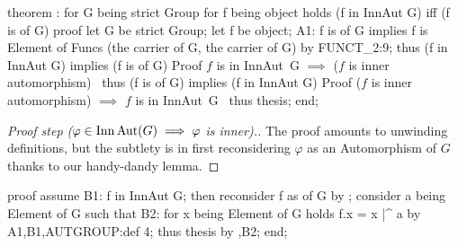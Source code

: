 theorem :
  for G being strict Group
  for f being object
  holds (f in InnAut G) iff (f is   of G)
proof
  let G be strict Group;
  let f be object;
  A1: f is  of G implies
      f is Element of Funcs (the carrier of G, the carrier of G) by FUNCT_2:9;
  thus (f in InnAut G) implies (f is   of G)
  \LA{}Proof $f$ is in \code{}InnAut\ G\edoc{} $\implies$ ($f$ is inner automorphism)~{\nwtagstyle{}}\RA{}
  thus (f is   of G) implies (f in InnAut G)
  \LA{}Proof ($f$ is inner automorphism) $\implies$ $f$ is in \code{}InnAut\ G\edoc{}~{\nwtagstyle{}}\RA{}
  thus thesis;
end;
\eatline
{}\nwendcode{}\nwdocspar
\begin{proof}[Proof step ($\varphi\in\operatorname{Inn}\operatorname{Aut}(G)\implies\varphi$ is inner).]
The proof amounts to unwinding
definitions, but the subtlety is in first reconsidering $\varphi$ as an
Automorphism of $G$ thanks to our handy-dandy lemma.
\end{proof}

\nwenddocs{}\endmoddef\nwstartdeflinemarkup{}\nwenddeflinemarkup
proof
  assume B1: f in InnAut G;
  then reconsider f as  of G by ;
  consider a being Element of G such that
  B2: for x being Element of G holds f.x = x |^ a
  by A1,B1,AUTGROUP:def 4;
  thus thesis by ,B2;
end;
\nwendcode{}\nwdocspar

